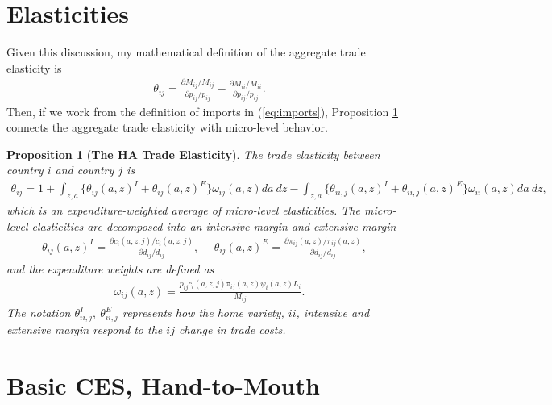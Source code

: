 \documentclass[pdftex,11pt]{article}
\newtheorem{prp}{Proposition}
\begin{document}
\section{Elasticities}

Given this discussion, my mathematical definition of the aggregate trade elasticity is
\begin{align}
\theta_{ij} = \frac{\partial M_{ij} / M_{ij}}{\partial p_{ij} / p_{ij}}  - \frac{\partial M_{ii} / M_{ii}}{\partial p_{ij} / p_{ij}}.
\label{eq:def_trade_elasticity}
\end{align}
Then, if we work from the definition of imports in (\ref{eq:imports}), Proposition \ref{prp:GET} connects the aggregate trade elasticity with micro-level behavior.

\begin{prp}[\textbf{The HA Trade Elasticity}] \label{prp:GET} The trade elasticity between country $i$ and country $j$ is
{\footnotesize
\begin{align}
\theta_{ij} = 1 + \int_{z,a} \bigg \{ \theta_{ij}(a,z)^{I} + \theta_{ij}(a,z)^{E} \bigg \}\omega_{ij}(a,z)da \ dz - \int_{z,a} \bigg \{ \theta_{ii,j}(a,z)^{I} + \theta_{ii,j}(a,z)^{E} \bigg \}\omega_{ii}(a,z)da \ dz,
\label{eq:trade-elasticity}
\end{align}
}which is an expenditure-weighted average of micro-level elasticities. The micro-level elasticities are decomposed into an intensive margin and extensive margin
{\footnotesize
\begin{align}
\nonumber
\theta_{ij}(a,z)^{I} = \frac{\partial c_{i}(a,z,j)/ c_{i}(a,z,j)}{\partial d_{ij} / d_{ij}}, \ \ \ \ \ \ \theta_{ij}(a,z)^{E} = \frac{\partial \pi_{ij}(a,z) / \pi_{ij}(a,z)}{\partial d_{ij} / d_{ij}}, \ \ \ \
\end{align}
}
and the expenditure weights are defined as
{\footnotesize
\begin{align}
\nonumber
\omega_{ij}(a,z) = \frac{p_{ij}c_{i}(a,z,j)\pi_{ij}(a,z) \psi_{i}(a,z) L_i}{M_{ij}}.
\end{align}
}The notation $\theta_{ii,j}^I,  \  \theta_{ii,j}^E $ represents how the home variety, $ii$, intensive and extensive margin respond to the $ij$ change in trade costs.
\end{prp}

\section{Basic CES, Hand-to-Mouth}
\end{document}
